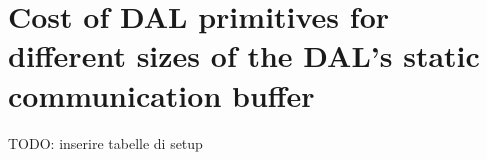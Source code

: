 \section{Cost of DAL primitives for different sizes of the DAL's static communication buffer}
\label{appendixB}

TODO: inserire tabelle di setup